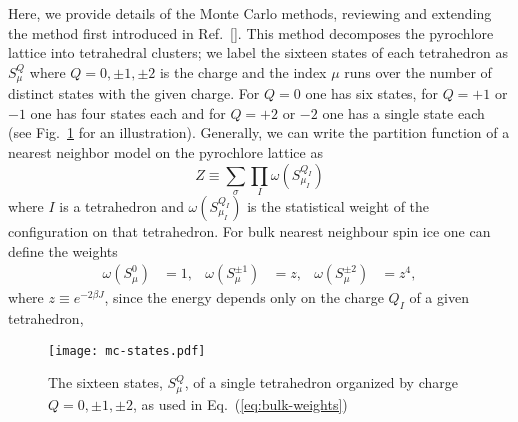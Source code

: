 \documentclass[aps,prx,reprint,runinaddress,superscriptaddress,amsmath,amssymb,floatfix,longbibliography]{revtex4-1}
\begin{document}
Here, we provide details of the Monte Carlo methods, reviewing and extending the method first introduced in Ref.~[]. This method decomposes the pyrochlore lattice into tetrahedral clusters; we label the sixteen states of each tetrahedron as $S^Q_\mu$ where $Q = 0, \pm 1, \pm 2$ is the charge and the index $\mu$ runs over the number of distinct states with the given charge. For $Q=0$ one has six states, for $Q=+1$ or $-1$ one has four states each and for $Q=+2$ or $-2$ one has a single state each (see Fig.~\ref{fig:mc:states} for an illustration). Generally, we can write the partition function of a nearest neighbor model on the pyrochlore lattice as
\begin{equation}
Z \equiv \sum_{\sigma} \prod_I \omega(S^{Q_I}_{\mu_I})
\end{equation}
where $I$ is a tetrahedron and $\omega(S^{Q_I}_{\mu_I})$ is the statistical weight of the configuration on that tetrahedron. For bulk nearest neighbour spin ice one can define the weights
\begin{align}
\label{eq:bulk-weights}
\omega(S^{0}_{\mu}) &= 1,  &
\omega(S^{\pm 1}_{\mu}) &= z,  &
\omega(S^{\pm 2}_{\mu}) &= z^4,  
\end{align}
where $z \equiv e^{-2\beta J}$, since the energy depends only on the charge $Q_I$ of a given tetrahedron,
\begin{figure}
  \centering
  \texttt{[image: mc-states.pdf]}
    \caption{The sixteen states, $S^Q_\mu$, of a single tetrahedron organized by charge $Q = 0, \pm 1, \pm 2$, as used in Eq.~(\ref{eq:bulk-weights})}
	\label{fig:mc:states}
\end{figure}
\end{document}
